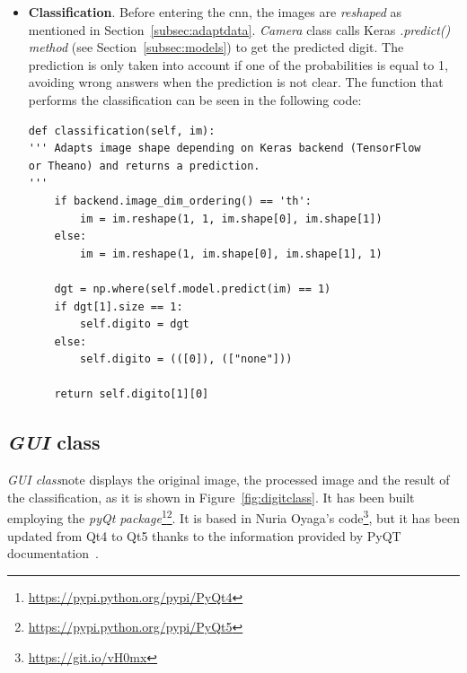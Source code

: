 \begin{itemize}
\begin{lstlisting}[frame=single]
	im_res = cv2.resize(im_blur, (28, 28))
	
	# Edge extraction.
	im_sobel_x = cv2.Sobel(im_res, cv2.CV_32F, 1, 0, ksize=5)
	im_sobel_y = cv2.Sobel(im_res, cv2.CV_32F, 0, 1, ksize=5)
	im_edges = cv2.add(abs(im_sobel_x), abs(im_sobel_y))
	im_edges = cv2.normalize(im_edges, None, 0, 255, cv2.NORM_MINMAX)
	im_edges = np.uint8(im_edges)
	
	return im_edges
\end{lstlisting}
	
	\item \textbf{Classification}. Before entering the \gls{cnn}, the images are \emph{reshaped} as mentioned in Section~\ref{subsec:adaptdata}. \textit{Camera} class calls Keras \emph{\textit{.predict()} method} (see Section~\ref{subsec:models}) to get the predicted digit. The prediction is only taken into account if one of the probabilities is equal to 1, avoiding wrong answers when the prediction is not clear. The function that performs the classification can be seen in the following code:
\begin{lstlisting}
def classification(self, im):
''' Adapts image shape depending on Keras backend (TensorFlow
or Theano) and returns a prediction.
'''
	if backend.image_dim_ordering() == 'th':
		im = im.reshape(1, 1, im.shape[0], im.shape[1])            
	else:      
		im = im.reshape(1, im.shape[0], im.shape[1], 1)            
	
	dgt = np.where(self.model.predict(im) == 1)
	if dgt[1].size == 1:
		self.digito = dgt
	else:
		self.digito = (([0]), (["none"]))
	
	return self.digito[1][0]
\end{lstlisting}
\end{itemize}

\subsection{\textit{GUI} class}
\emph{\textit{GUI} class}note displays the original image, the processed image and the result of the classification, as it is shown in Figure~\ref{fig:digitclass}. It has been built employing the \emph{pyQt package}\footnote{\url{https://pypi.python.org/pypi/PyQt4}}\footnote{\url{https://pypi.python.org/pypi/PyQt5}}. It is based in Nuria Oyaga's code\footnote{\url{https://git.io/vH0mx}}, but it has been updated from Qt4 to Qt5 thanks to the information provided by PyQT documentation~\cite{pyqt5}.

